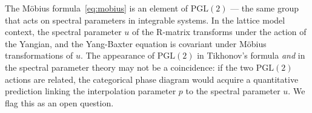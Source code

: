 \begin{remark}
\label{rem:pgl2}
The M\"obius formula~\eqref{eq:mobius} is an element of $\mathrm{PGL}(2)$
--- the same group that acts on spectral parameters in integrable
systems.  In the lattice model context, the spectral parameter $u$
of the R-matrix transforms under the action of the Yangian, and the
Yang-Baxter equation is covariant under M\"obius transformations of
$u$.  The appearance of $\mathrm{PGL}(2)$ in Tikhonov's formula
\emph{and} in the spectral parameter theory may not be a coincidence:
if the two $\mathrm{PGL}(2)$ actions are related, the categorical
phase diagram would acquire a quantitative prediction linking the
interpolation parameter $p$ to the spectral parameter $u$.  We flag
this as an open question.
\end{remark}

